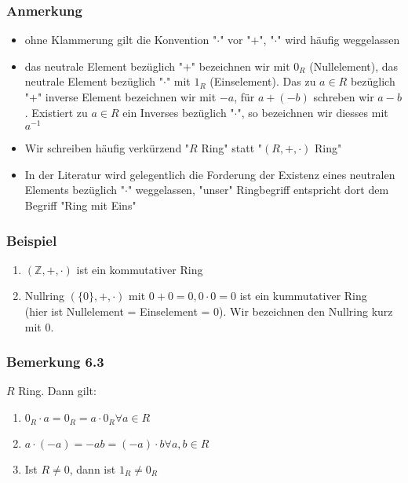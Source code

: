 \documentclass[a4paper]{scrartcl}
\DeclareMathOperator{\Forall}{\forall}
\theoremstyle{definition}
\theoremstyle{plain}
\theoremstyle{plain}
\theoremstyle{remark}
\theoremstyle{remark}
\theoremstyle{remark}
\begin{document}
\subsubsection{Anmerkung}
\label{sec-3-2-1}
\begin{itemize}
\item ohne Klammerung gilt die Konvention "$\cdot$" vor "$+$", "$\cdot$" wird häufig weggelassen
\item das neutrale Element bezüglich "$+$" bezeichnen wir mit $0_R$ (Nullelement), das neutrale Element bezüglich "$\cdot$" mit $1_R$ (Einselement).
Das zu $a\in R$ bezüglich "$+$" inverse Element bezeichnen wir mit $-a$,
für $a + (-b)$ schreben wir $a - b$. Existiert zu $a\in R$ ein Inverses bezüglich "$\cdot$", so bezeichnen wir diesses mit $a^{-1}$
\item Wir schreiben häufig verkürzend "$R$ Ring" statt "$(R,+,\cdot)$ Ring"
\item In der Literatur wird gelegentlich die Forderung der Existenz eines neutralen Elements bezüglich "$\cdot$" weggelassen, "unser" Ringbegriff
entspricht dort dem Begriff "Ring mit Eins"
\end{itemize}
\subsubsection{Beispiel}
\label{sec-3-2-2}
\begin{enumerate}
\item $(\mathbb{Z},+,\cdot)$ ist ein kommutativer Ring
\item Nullring $(\{0\},+,\cdot)$ mit $0 + 0 = 0, 0\cdot 0 = 0$ ist ein kummutativer Ring \\
       (hier ist Nullelement = Einselement = 0). Wir bezeichnen den Nullring kurz mit $0$.
\end{enumerate}
\subsubsection{Bemerkung 6.3}
\label{sec-3-2-3}
$R$ Ring. Dann gilt:
\begin{enumerate}
\item $0_R\cdot a = 0_R = a\cdot 0_R\Forall a\in R$
\item $a\cdot (-a) = - a b = (-a) \cdot b \Forall a,b\in R$
\item Ist $R\neq 0$, dann ist $1_R\neq 0_R$
\end{enumerate}
\end{document}
